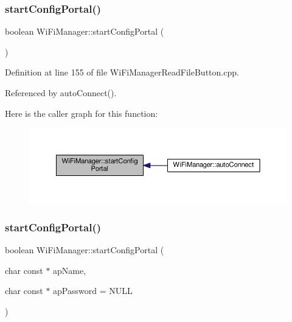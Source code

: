 \subsubsection{\texorpdfstring{start\+Config\+Portal()}{startConfigPortal()}\hspace{0.1cm}{\footnotesize\ttfamily [1/2]}}
{\footnotesize\ttfamily boolean Wi\+Fi\+Manager\+::start\+Config\+Portal (\begin{DoxyParamCaption}{ }\end{DoxyParamCaption})}



Definition at line 155 of file Wi\+Fi\+Manager\+Read\+File\+Button.\+cpp.



Referenced by auto\+Connect().

Here is the caller graph for this function\+:
\nopagebreak
\begin{figure}[H]
\begin{center}
\leavevmode
\includegraphics[width=350pt]{d4/dc8/class_wi_fi_manager_ad781751307f7f623956126096a09a545_icgraph}
\end{center}
\end{figure}
\mbox{\label{class_wi_fi_manager_afaca5021edffb4d9a5bd39f7b0f7a686}} 
\subsubsection{\texorpdfstring{start\+Config\+Portal()}{startConfigPortal()}\hspace{0.1cm}{\footnotesize\ttfamily [2/2]}}
{\footnotesize\ttfamily boolean Wi\+Fi\+Manager\+::start\+Config\+Portal (\begin{DoxyParamCaption}\item[{char const $\ast$}]{ap\+Name,  }\item[{char const $\ast$}]{ap\+Password = {\ttfamily NULL} }\end{DoxyParamCaption})}



